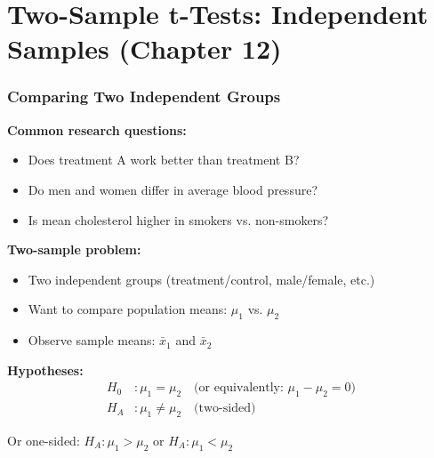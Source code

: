 \documentclass{beamer}
\begin{document}
\section{Two-Sample t-Tests: Independent Samples (Chapter 12)}

\begin{frame}
\frametitle{Comparing Two Independent Groups}
\textbf{Common research questions:}
\begin{itemize}
\item Does treatment A work better than treatment B?
\item Do men and women differ in average blood pressure?
\item Is mean cholesterol higher in smokers vs. non-smokers?
\end{itemize}

\vspace{0.5cm}
\textbf{Two-sample problem:}
\begin{itemize}
\item Two independent groups (treatment/control, male/female, etc.)
\item Want to compare population means: $\mu_1$ vs. $\mu_2$
\item Observe sample means: $\bar{x}_1$ and $\bar{x}_2$
\end{itemize}

\vspace{0.5cm}
\textbf{Hypotheses:}
\begin{align*}
H_0&: \mu_1 = \mu_2 \quad \text{(or equivalently: } \mu_1 - \mu_2 = 0\text{)}\\
H_A&: \mu_1 \neq \mu_2 \quad \text{(two-sided)}
\end{align*}

Or one-sided: $H_A: \mu_1 > \mu_2$ or $H_A: \mu_1 < \mu_2$
\end{frame}
\end{document}
